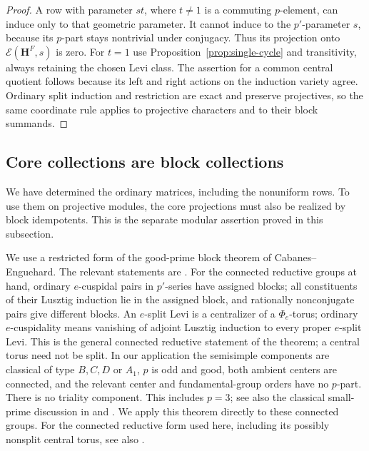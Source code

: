 \begin{proof}
A row with parameter $st$, where $t\ne1$ is a commuting
$p$-element, can induce only to that geometric parameter.
It cannot induce to the $p'$-parameter $s$, because its
$p$-part stays nontrivial under conjugacy.  Thus its projection
onto $\mathcal E(\mathbf H^F,s)$ is zero.  For $t=1$ use
Proposition~\ref{prop:single-cycle} and transitivity, always
retaining the chosen Levi class.  The assertion for a common
central quotient follows because its left and right actions
on the induction variety agree.  Ordinary split induction
and restriction are exact and preserve projectives, so the
same coordinate rule applies to projective characters and
to their block summands.
\end{proof}

\subsection{Core collections are block collections}

We have determined the ordinary matrices, including the
nonuniform rows.  To use them on projective modules, the core
projections must also be realized by block idempotents.  This is
the separate modular assertion proved in this subsection.

We use a restricted form of the good-prime block theorem of
Cabanes--Enguehard.  The relevant statements are
\cite[Theorems 2.5 and 4.1]{CE99}.
For the connected reductive groups at hand, ordinary
$e$-cuspidal pairs in $p'$-series have assigned blocks; all
constituents of their Lusztig induction lie in the assigned
block, and rationally nonconjugate pairs give different blocks.
An $e$-split Levi is a centralizer of a $\Phi_e$-torus; ordinary
$e$-cuspidality means vanishing of adjoint Lusztig induction to
every proper $e$-split Levi.  This is the general connected
reductive statement of the theorem; a central torus need not be
split.  In our application the semisimple components are
classical of type $B,C,D$ or $A_1$, $p$ is odd and good, both
ambient centers are connected, and the relevant center and
fundamental-group orders have no $p$-part.  There is no
triality component.  This includes $p=3$; see also the
classical small-prime discussion in \cite[Remark~5.2]{CE99}
and \cite[proof of Theorem~3.14(e)]{KessarMalle2015}.
We apply this theorem directly to these connected groups.
For the connected reductive form used here, including its possibly
nonsplit central torus, see also
\cite[Assumption~2.1.2 and Propositions~2.1.6--2.1.7]{EnguehardJordan}.

